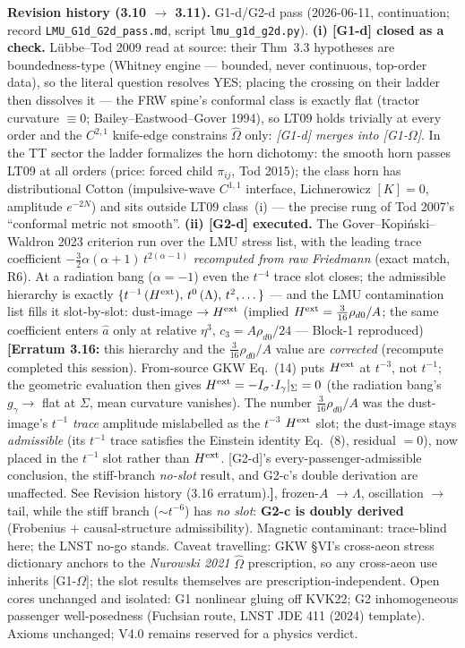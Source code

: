 \documentclass[11pt]{article}
\begin{document}
{\noindent\textbf{Revision history (3.10 $\to$ 3.11).} G1-d/G2-d pass (2026-06-11, continuation; record \texttt{LMU\_G1d\_G2d\_pass.md}, script \texttt{lmu\_g1d\_g2d.py}). \textbf{(i) [G1-d] closed as a check.} L\"ubbe--Tod 2009 read at source: their Thm~3.3 hypotheses are boundedness-type (Whitney engine --- bounded, never continuous, top-order data), so the literal question resolves YES; placing the crossing on their ladder then dissolves it --- the FRW spine's conformal class is exactly flat (tractor curvature $\equiv0$; Bailey--Eastwood--Gover 1994), so LT09 holds trivially at every order and the $C^{2,1}$ knife-edge constrains $\hat\Omega$ only: \emph{[G1-d] merges into [G1-$\Omega$]}. In the TT sector the ladder formalizes the horn dichotomy: the smooth horn passes LT09 at all orders (price: forced child $\pi_{ij}$, Tod 2015); the class horn has distributional Cotton (impulsive-wave $C^{1,1}$ interface, Lichnerowicz $[K]=0$, amplitude $e^{-2N}$) and sits outside LT09 class~(i) --- the precise rung of Tod 2007's ``conformal metric not smooth''. \textbf{(ii) [G2-d] executed.} The Gover--Kopi\'nski--Waldron 2023 criterion run over the LMU stress list, with the leading trace coefficient $-\tfrac32\alpha(\alpha+1)\,t^{2(\alpha-1)}$ \emph{recomputed from raw Friedmann} (exact match, R6). At a radiation bang ($\alpha=-1$) even the $t^{-4}$ trace slot closes; the admissible hierarchy is exactly $\{t^{-1}\,(H^{\rm ext}),\,t^{0}\,(\Lambda),\,t^{2},\dots\}$ --- and the LMU contamination list fills it slot-by-slot: dust-image $\to H^{\rm ext}$ (implied $H^{\rm ext}=\tfrac{3}{16}\rho_{d0}/A$; the same coefficient enters $\hat a$ only at relative $\eta^3$, $c_3=A\rho_{d0}/24$ --- Block-1 reproduced) \textbf{[Erratum 3.16:} this hierarchy and the $\tfrac{3}{16}\rho_{d0}/A$ value are \emph{corrected} (recompute completed this session). From-source GKW Eq.~(14) puts $H^{\rm ext}$ at $t^{-3}$, not $t^{-1}$; the geometric evaluation then gives $H^{\rm ext}=-I_\sigma\!\cdot\!I_\gamma|_\Sigma=0$ (the radiation bang's $g_\gamma\!\to$ flat at $\Sigma$, mean curvature vanishes). The number $\tfrac{3}{16}\rho_{d0}/A$ was the dust-image's $t^{-1}$ \emph{trace} amplitude mislabelled as the $t^{-3}$ $H^{\rm ext}$ slot; the dust-image stays \emph{admissible} (its $t^{-1}$ trace satisfies the Einstein identity Eq.~(8), residual $=0$), now placed in the $t^{-1}$ slot rather than $H^{\rm ext}$. [G2-d]'s every-passenger-admissible conclusion, the stiff-branch \emph{no-slot} result, and G2-c's double derivation are unaffected. See Revision history (3.16 erratum).\textbf{]}, frozen-$A$ $\to\Lambda$, oscillation $\to$ tail, while the stiff branch ($\sim t^{-6}$) has \emph{no slot}: \textbf{G2-c is doubly derived} (Frobenius $+$ causal-structure admissibility). Magnetic contaminant: trace-blind here; the LNST no-go stands. Caveat travelling: GKW \S VI's cross-aeon stress dictionary anchors to the \emph{Nurowski 2021} $\hat\Omega$ prescription, so any cross-aeon use inherits [G1-$\Omega$]; the slot results themselves are prescription-independent. Open cores unchanged and isolated: G1 nonlinear gluing off KVK22; G2 inhomogeneous passenger well-posedness (Fuchsian route, LNST JDE 411 (2024) template). Axioms unchanged; V4.0 remains reserved for a physics verdict.

}
\end{document}
